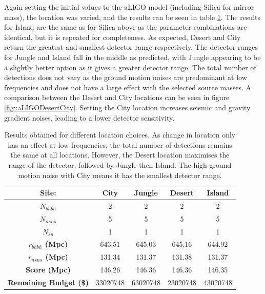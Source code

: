 \documentclass{article}
\begin{document}
Again setting the initial values to the aLIGO model (including Silica for mirror mass), the location was varied, and the results can be seen in table \ref{tab::locationtest}. The results for Island are the same as for Silica above as the parameter combinations are identical, but it is repeated for completeness. As expected, Desert and City return the greatest and smallest detector range respectively. The detector ranges for Jungle and Island fall in the middle as predicted, with Jungle appearing to be a slightly better option as it gives a greater detector range. The total number of detections does not vary as the ground motion noises are predominant at low frequencies and does not have a large effect with the selected source masses. A comparison between the Desert and City locations can be seen in figure \ref{fig::aLIGODesertCity}. Setting the City location increases seismic and gravity gradient noises, leading to a lower detector sensitivity. 
    
    \begin{table}[h!]
    \centering
    \captionsetup{width=0.9\textwidth}
    \caption{Results obtained for different location choices. As change in location only has an effect at low frequencies, the total number of detections remains the same at all locations. However, the Desert location maximises the range of the detector, followed by Jungle then Island. The high ground motion noise with City means it has the smallest detector range.}
    \begin{tabular}{ |c|c|c|c|c| } 
     \hline
     \textbf{Site:} & \textbf{City}  & \textbf{Jungle}  & \textbf{Desert}  & \textbf{Island} \\     \hline
     \textbf{$N_{bhbh}$}  & 2 & 2 & 2 & 2\\ 
     \hline
     \textbf{$N_{nsns}$}  & 5 & 5 & 5 & 5\\ 
     \hline
     \textbf{$N_{sn}$}  & 1 & 1  & 1 & 1 \\ 
     \hline
     \textbf{$r_{bhbh}$ (Mpc)}  & 643.51 & 645.03 & 645.16  & 644.92 \\ 
     \hline
     \textbf{$r_{nsns}$ (Mpc)}  & 131.34  & 131.37  & 131.38 & 131.37 \\ 
     \hline
    \textbf{Score (Mpc)}  & 146.26  & 146.36  & 146.36  & 146.35 \\ 
    \hline
    \textbf{Remaining Budget (\$)}  & 33020748  & 63020748  & 23020748 & 43020748 \\ 
    \hline
    \end{tabular}
    \label{tab::locationtest}
    \end{table}
    
\end{document}
